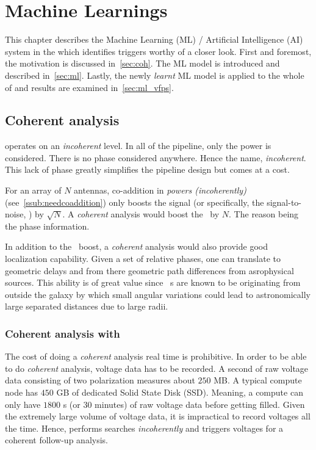 \chapter{Machine Learnings}
\label{ch:ml}

\par This chapter describes the Machine Learning (ML) / Artificial Intelligence (AI) system in the \vf which identifies triggers worthy of a closer look. First and foremost, the motivation is discussed in~\autoref{sec:coh}.
The ML model is introduced and described in~\autoref{sec:ml}. 
Lastly, the newly \emph{learnt} ML model is applied to the whole of \vfps and results are examined in~\autoref{sec:ml_vfps}.

\section {Coherent analysis}
\label{sec:coh}

\par \vf operates on an \emph{incoherent} level. In all of the pipeline, only the power is considered.
There is no phase considered anywhere.
Hence the name, \emph{incoherent}.
This lack of phase greatly simplifies the pipeline design but comes at a cost.

\par For an array of $N$ antennas, co-addition in \emph{powers (incoherently)} (see~\autoref{ssub:needcoaddition}) only boosts the signal (or specifically, the signal-to-noise, \sn) by $\sqrt{N}$. 
A \emph{coherent} analysis would boost the \sn~by $N$. The reason being the phase information.

\par In addition to the \sn~boost, a \emph{coherent} analysis would also provide good localization capability.
Given a set of relative phases, one can translate to geometric delays and from there geometric path differences from asrophysical sources.
This ability is of great value since \frb~s are known to be originating from outside the galaxy by which small angular variations could lead to astronomically large separated distances due to large radii.

\subsection{Coherent analysis with \vf}

\par The cost of doing a \emph{coherent} analysis real time is prohibitive. 
In order to be able to do \emph{coherent} analysis, voltage data has to be recorded. 
A second of raw voltage data consisting of two polarization measures about $250$ MB. 
A typical \vf compute node has $450$ GB of dedicated Solid State Disk (SSD). Meaning, a \vf compute can only have $1800$ s (or $30$ minutes) of raw voltage data before getting filled.
Given the extremely large volume of voltage data, it is impractical to record voltages all the time.
Hence, \vf performs searches \emph{incoherently} and triggers voltages for a coherent follow-up analysis.

